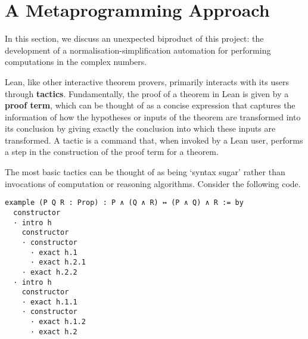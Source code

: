 \section{A Metaprogramming Approach}

\begin{comment}
Begin by saying a few words about what metaprogramming is. Then go into subsections. Idea:
1. Establish difficulty of doing computations in \C. Give examples, yes, but also stress that existing automation was unable to unpack the structural nuances of the way \C is defined. Also maybe talk about the whole "is I a numeral" debate, but I think this might be a rabbit-hole...
2. Talk about the algorithm behind norm_numI. Talk about the original version we worked on with Heather and Edison at/after metaprogramming and at Xena.
3. Say something about what Heather's latest modifications look like. Maybe also talk about how the approach can be generalised to quaternion algebras or splitting fields (what's similar and what's different between norm_numI and these things), but don't talk about the maths of either of these. Stress that this is still under development, and that this opens the door to a world of metaprogramming possibilities.
\end{comment}

In this section, we discuss an unexpected biproduct of this project: the development of a normalisation-simplification automation for performing computations in the complex numbers.

Lean, like other interactive theorem provers, primarily interacts with its users through \textbf{tactics}. Fundamentally, the proof of a theorem in Lean is given by a \textbf{proof term}, which can be thought of as a concise expression that captures the information of how the hypotheses or inputs of the theorem are transformed into its conclusion by giving exactly the conclusion into which these inputs are transformed. A tactic is a command that, when invoked by a Lean user, performs a step in the construction of the proof term for a theorem.

The most basic tactics can be thought of as being `syntax sugar' rather than invocations of computation or reasoning algorithms. Consider the following code.
\begin{lstlisting}[caption=A tactic proof of the associativity of $\land$, label=Ch5:Listing:And_assoc_tactic]
example (P Q R : Prop) : P ∧ (Q ∧ R) ↔ (P ∧ Q) ∧ R := by
  constructor
  · intro h
    constructor
    · constructor
      · exact h.1
      · exact h.2.1
    · exact h.2.2
  · intro h
    constructor
    · exact h.1.1
    · constructor
      · exact h.1.2
      · exact h.2
\end{lstlisting}

